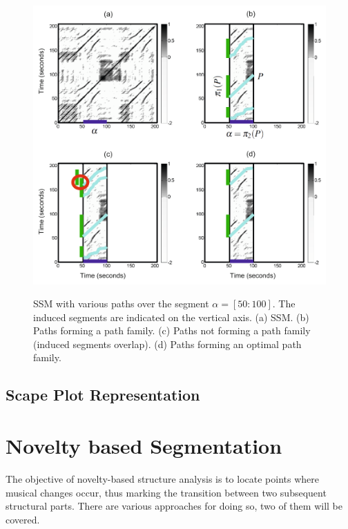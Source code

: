 \documentclass[a4paper, 9pt, twocolumn]{extarticle}
\begin{document}
\begin{figure}[h]
  \includegraphics[width=\linewidth]{images/pathFamilies.png}
  \label{fig:pathFamilies}
	\begin{center}
		\caption{SSM with various paths over the segment $\alpha=[50:100]$. The induced segments are indicated on the vertical axis. (a) SSM. (b) Paths forming a path family. (c) Paths not forming a path family (induced segments overlap). (d) Paths forming an optimal path family.}
	\end{center}
\end{figure}

\subsection{Scape Plot Representation}
\label{subsection:scapePlot}


\section{Novelty based Segmentation}
\label{section:novelty}

The objective of novelty-based structure analysis is to locate points where musical changes occur, thus marking the transition between two subsequent structural parts. There are various approaches for doing so, two of them will be covered. 
\end{document}
